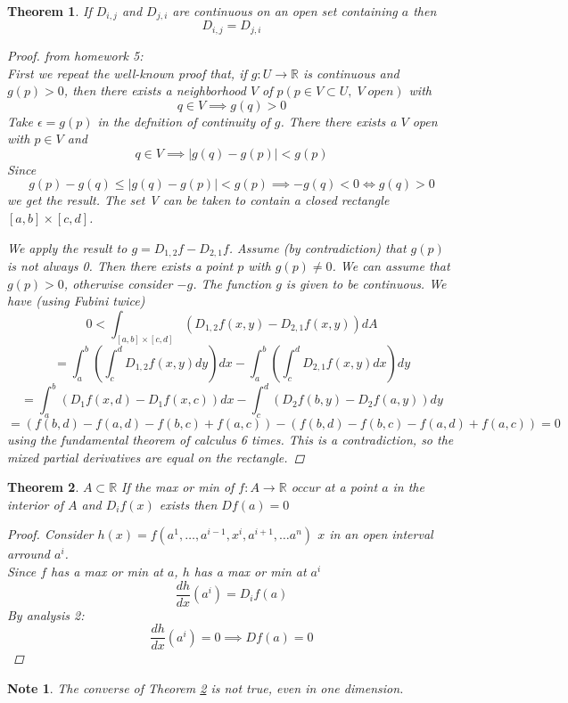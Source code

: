 \documentclass[12pt]{article}
\def\RR{\mathbb{R}}
\newtheorem{theorem}{Theorem}[section]
\newtheorem*{note}{Note}
\begin{document}
\begin{theorem}
If $D_{i,j}$ and $D_{j,i}$ are continuous on an open set containing $a$ then
 \[D_{i,j} = D_{j,i}\]
\begin{proof} from homework 5:\\ 
First we repeat the well-known proof that, if $g : U \rightarrow \RR$ is continuous and $g(p) > 0$,
then there exists a neighborhood $V$ of $ p (p \in V \subset U,\; V \; open)$ with
\[q \in V \implies g(q) > 0\]
Take $\epsilon = g(p)$ in the defnition of continuity of $g$. There there exists a $V$ open with
$p \in V$ and
\[q \in V \implies |g(q) - g(p)| < g(p)\]
Since 
\[g(p) - g(q) \leq |g(q) - g(p)| < g(p) \implies  -g(q) < 0 \iff g(q) > 0\]
we get the result. The set V can be taken to contain a closed rectangle $[a, b] \! \times\! [c, d]$.

We apply the result to $g = D_{1,2}f - D_{2,1}f$. Assume (by contradiction) that $g(p)$ is not
always 0. Then there exists a point $p$ with $g(p) \neq 0$. We can assume that $g(p) > 0$,
otherwise consider $-g$. The function $g$ is given to be continuous. We have (using
Fubini twice)
\[0<\int_{[a, b] \! \times\! [c, d]}(D_{1,2}f(x,y) - D_{2,1}f(x,y))dA\]
\[=\int_{a}^{b}\left(\int_{c}^{d}D_{1,2}f(x,y)dy\right)dx - \int_{a}^{b}\left(\int_{c}^{d}D_{2,1}f(x,y)dx\right)dy\]
\[= \int_{a}^{b}\left(D_{1}f(x,d) - D_{1}f(x,c)\right)dx - \int_{c}^{d}\left(D_{2}f(b,y) - D_{2}f(a,y)\right)dy\]
\[= (f(b, d)-  f(a, d) - f(b, c) + f(a, c)) - (f(b, d)-  f(b, c) - f(a, d) + f(a, c)) = 0\]
using the fundamental theorem of calculus 6 times. This is a contradiction, so the
mixed partial derivatives are equal on the rectangle.
\end{proof}
\end{theorem}

\begin{theorem}\label{maxmin}
$A \subset \RR$ If the max or min of $f:A \rightarrow \RR$ occur at a point $a$ in the interior of $A$ and $D_{i}f(x)$ exists then $Df(a) = 0$
\begin{proof}
Consider $h(x) = f(a^{1}, \dots , a^{i-1} , x^{i}, a^{i+1}, \dots a^{n})$ $x$ in an open interval arround $a^{i}$.\\ Since $f$ has a max or min at $a$, $h$ has a max or min at $a^{i}$
\[\frac{dh}{dx}(a^{i}) = D_{i}f(a)\]
By analysis 2:
\[\frac{dh}{dx}(a^{i}) =0 \implies Df(a) = 0\]
\end{proof}
\end{theorem}

\begin{note}
The converse of Theorem \ref{maxmin} is not true, even in one dimension.
\end{note}
\end{document}
